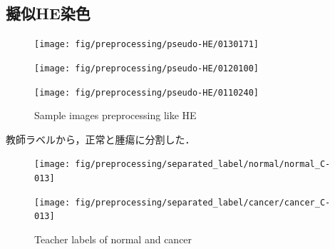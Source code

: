 \subsection{擬似HE染色}
\begin{figure}[H]
	\centering
	
	\begin{minipage}{0.8\columnwidth}
		\centering
		\texttt{[image: fig/preprocessing/pseudo-HE/0130171]}
	\end{minipage}
	\begin{minipage}{0.8\columnwidth}
		\centering
		\texttt{[image: fig/preprocessing/pseudo-HE/0120100]}
	\end{minipage}
	\begin{minipage}{0.8\columnwidth}
		\centering
	\end{minipage}
	\begin{minipage}{0.8\columnwidth}
		\centering
		\texttt{[image: fig/preprocessing/pseudo-HE/0110240]}
	\end{minipage}

	
	\caption{Sample images preprocessing like HE}
	\label{fig:HElike}

\end{figure}


教師ラベルから，正常と腫瘍に分割した．
\begin{figure}[H]
	\centering

	\begin{minipage}{0.4\columnwidth}
		\centering
		\texttt{[image: fig/preprocessing/separated\_label/normal/normal\_C-013]}
	\end{minipage}
	\begin{minipage}{0.4\columnwidth}
		\centering
		\texttt{[image: fig/preprocessing/separated\_label/cancer/cancer\_C-013]}
	\end{minipage}

	\caption{Teacher labels of normal and cancer}
	\label{fig:検体A教師ラベル}

\end{figure}

